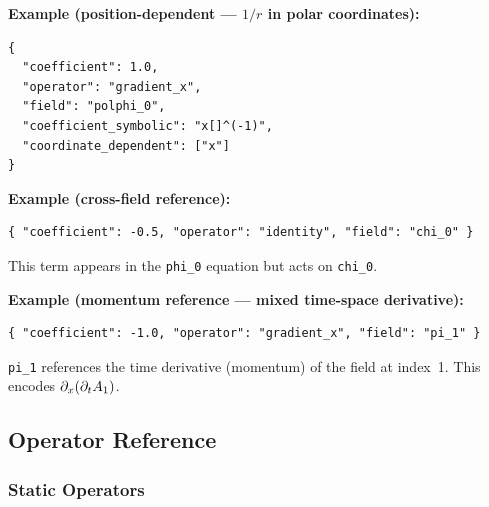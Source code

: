 \textbf{Example (position-dependent --- $1/r$ in polar coordinates):}

\begin{lstlisting}[style=json]
{
  "coefficient": 1.0,
  "operator": "gradient_x",
  "field": "polphi_0",
  "coefficient_symbolic": "x[]^(-1)",
  "coordinate_dependent": ["x"]
}
\end{lstlisting}

\textbf{Example (cross-field reference):}

\begin{lstlisting}[style=json]
{ "coefficient": -0.5, "operator": "identity", "field": "chi_0" }
\end{lstlisting}

This term appears in the \texttt{phi\_0} equation but acts on \texttt{chi\_0}.

\textbf{Example (momentum reference --- mixed time-space derivative):}

\begin{lstlisting}[style=json]
{ "coefficient": -1.0, "operator": "gradient_x", "field": "pi_1" }
\end{lstlisting}

\texttt{pi\_1} references the time derivative (momentum) of the field at index~1. This encodes $\partial_x(\partial_t A_1)$.


\subsection{Operator Reference}
\label{sec:json-operators}

\subsubsection{Static Operators}
\label{sec:json-static-operators}

